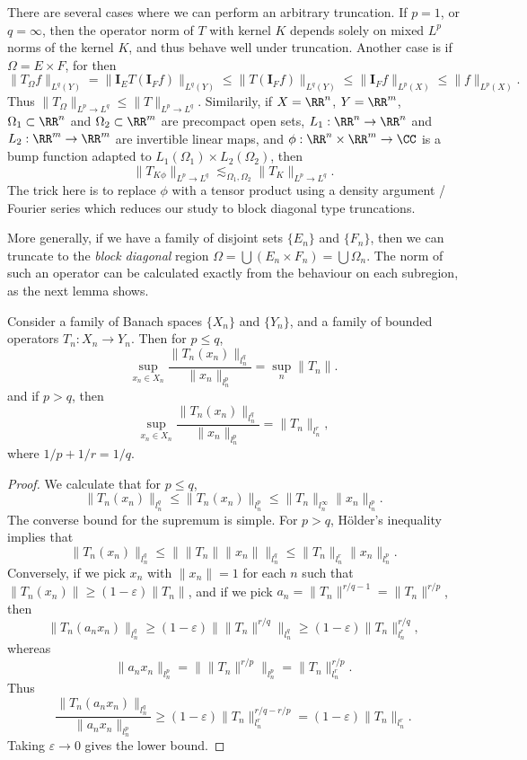 There are several cases where we can perform an arbitrary truncation. If $p = 1$, or $q = \infty$, then the operator norm of $T$ with kernel $K$ depends solely on mixed $L^p$ norms of the kernel $K$, and thus behave well under truncation. Another case is if $\Omega = E \times F$, for then
%
\[ \| T_\Omega f \|_{L^q(Y)} = \| \mathbf{I}_E T(\mathbf{I}_F f) \|_{L^q(Y)} \leq \| T(\mathbf{I}_F f) \|_{L^q(Y)} \leq \| \mathbf{I}_F f \|_{L^p(X)} \leq \| f \|_{L^p(X)}. \]
%
Thus $\| T_\Omega \|_{L^p \to L^q} \leq \| T \|_{L^p \to L^q}$. Similarily, if $X = \RR^n$, $Y = \RR^m$, $\Omega_1 \subset \RR^n$ and $\Omega_2 \subset \RR^m$ are precompact open sets, $L_1: \RR^n \to \RR^n$ and $L_2: \RR^m \to \RR^m$ are invertible linear maps, and $\phi: \RR^n \times \RR^m \to \CC$ is a bump function adapted to $L_1(\Omega_1) \times L_2(\Omega_2)$, then
%
\[ \| T_{K \phi} \|_{L^p \to L^q} \lesssim_{\Omega_1,\Omega_2} \| T_K \|_{L^p \to L^q}. \]
%
The trick here is to replace $\phi$ with a tensor product using a density argument / Fourier series which reduces our study to block diagonal type truncations.

More generally, if we have a family of disjoint sets $\{ E_n \}$ and $\{ F_n \}$, then we can truncate to the \emph{block diagonal} region $\Omega = \bigcup (E_n \times F_n) = \bigcup \Omega_n$. The norm of such an operator can be calculated exactly from the behaviour on each subregion, as the next lemma shows.

\begin{lemma}
    Consider a family of Banach spaces $\{ X_n \}$ and $\{ Y_n \}$, and a family of bounded operators $T_n: X_n \to Y_n$. Then for $p \leq q$,
    \[ \sup_{x_n \in X_n} \frac{\| T_n(x_n) \|_{l^q_n}}{\| x_n \|_{l^p_n}} = \sup_n \| T_n \|. \]
    and if $p > q$, then
    \[ \sup_{x_n \in X_n} \frac{\| T_n(x_n) \|_{l^q_n}}{\| x_n \|_{l^p_n}} = \| T_n \|_{l^r_n}, \]
    where $1/p + 1/r = 1/q$.
\end{lemma}
\begin{proof}
    We calculate that for $p \leq q$,
    \[ \| T_n(x_n) \|_{l^q_n} \leq \| T_n(x_n) \|_{l^p_n} \leq \| T_n \|_{l^\infty_n} \| x_n \|_{l^p_n}. \]
    The converse bound for the supremum is simple. For $p > q$, H\"{o}lder's inequality implies that
    \[ \| T_n(x_n) \|_{l^q_n} \leq \| \| T_n \| \| x_n \| \|_{l^q_n} \leq \| T_n \|_{l^r_n} \| x_n \|_{l^p_n}. \]
    Conversely, if we pick $x_n$ with $\| x_n \| = 1$ for each $n$ such that $\| T_n(x_n) \| \geq (1 - \varepsilon) \| T_n \|$, and if we pick $a_n = \| T_n \|^{r/q - 1} = \| T_n \|^{r/p}$, then
    \[ \| T_n(a_n x_n) \|_{l^q_n} \geq (1 - \varepsilon) \| \| T_n \|^{r/q} \|_{l^q_n} \geq (1 - \varepsilon) \| T_n \|_{l^r_n}^{r/q}, \]
    whereas
    \[ \| a_n x_n \|_{l^p_n} = \| \| T_n \|^{r/p} \|_{l^p_n} = \| T_n \|_{l^r_n}^{r/p}. \]
    Thus
    \[ \frac{\| T_n(a_n x_n) \|_{l^q_n}}{\| a_n x_n \|_{l^p_n}} \geq (1 - \varepsilon) \| T_n \|_{l^r_n}^{r/q - r/p} = (1 - \varepsilon) \| T_n \|_{l^r_n}. \]
    Taking $\varepsilon \to 0$ gives the lower bound.
\end{proof}


